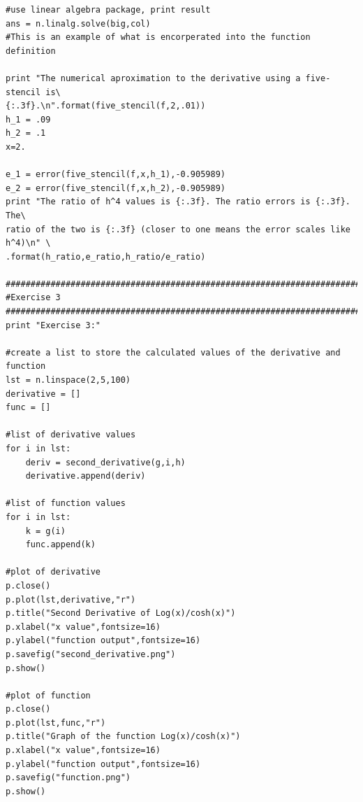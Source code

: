 \documentclass[11pt]{article}
\begin{document}
\begin{verbatim}
#use linear algebra package, print result
ans = n.linalg.solve(big,col)
#This is an example of what is encorperated into the function definition

print "The numerical aproximation to the derivative using a five-stencil is\
{:.3f}.\n".format(five_stencil(f,2,.01))
h_1 = .09
h_2 = .1
x=2. 

e_1 = error(five_stencil(f,x,h_1),-0.905989)
e_2 = error(five_stencil(f,x,h_2),-0.905989)
print "The ratio of h^4 values is {:.3f}. The ratio errors is {:.3f}. The\
ratio of the two is {:.3f} (closer to one means the error scales like h^4)\n" \
.format(h_ratio,e_ratio,h_ratio/e_ratio)

#############################################################################
#Exercise 3
#############################################################################
print "Exercise 3:"

#create a list to store the calculated values of the derivative and function
lst = n.linspace(2,5,100)
derivative = []
func = []

#list of derivative values
for i in lst:
    deriv = second_derivative(g,i,h)
    derivative.append(deriv)
    
#list of function values
for i in lst:
    k = g(i)
    func.append(k)

#plot of derivative
p.close()
p.plot(lst,derivative,"r")
p.title("Second Derivative of Log(x)/cosh(x)")
p.xlabel("x value",fontsize=16)
p.ylabel("function output",fontsize=16)
p.savefig("second_derivative.png")
p.show()

#plot of function
p.close()
p.plot(lst,func,"r")
p.title("Graph of the function Log(x)/cosh(x)")
p.xlabel("x value",fontsize=16)
p.ylabel("function output",fontsize=16)
p.savefig("function.png")
p.show()
\end{verbatim}
\end{document}
